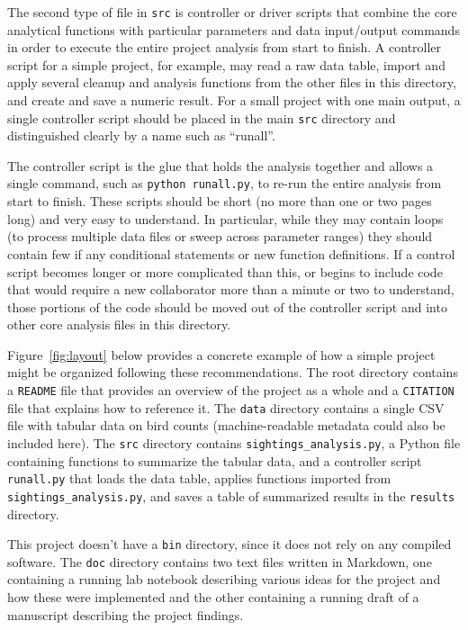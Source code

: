 \documentclass[10pt]{article}
\begin{document}
The second type of file in \texttt{src} is controller or driver
scripts that combine the core analytical functions with particular
parameters and data input/output commands in order to execute the
entire project analysis from start to finish. A controller script for
a simple project, for example, may read a raw data table, import and
apply several cleanup and analysis functions from the other files in
this directory, and create and save a numeric result. For a small
project with one main output, a single controller script should be
placed in the main \texttt{src} directory and distinguished clearly by
a name such as ``runall''.

The controller script is the glue that holds the analysis together and
allows a single command, such as \texttt{python runall.py}, to re-run
the entire analysis from start to finish. These scripts should be
short (no more than one or two pages long) and very easy to
understand.  In particular, while they may contain loops (to process
multiple data files or sweep across parameter ranges) they should
contain few if any conditional statements or new function
definitions. If a control script becomes longer or more complicated
than this, or begins to include code that would require a new
collaborator more than a minute or two to understand, those portions
of the code should be moved out of the controller script and into
other core analysis files in this directory.

Figure~\ref{fig:layout} below provides a concrete example of how a
simple project might be organized following these recommendations. The
root directory contains a \texttt{README} file that provides an
overview of the project as a whole and a \texttt{CITATION} file that
explains how to reference it. The \texttt{data} directory contains a
single CSV file with tabular data on bird counts (machine-readable
metadata could also be included here). The \texttt{src} directory
contains \texttt{sightings\_analysis.py}, a Python file containing
functions to summarize the tabular data, and a controller script
\texttt{runall.py} that loads the data table, applies functions
imported from \texttt{sightings\_analysis.py}, and saves a table of
summarized results in the \texttt{results} directory.

This project doesn't have a \texttt{bin} directory, since it does not
rely on any compiled software. The \texttt{doc} directory contains two
text files written in Markdown, one containing a running lab notebook
describing various ideas for the project and how these were implemented
and the other containing a running draft of a manuscript describing the
project findings.
\end{document}
